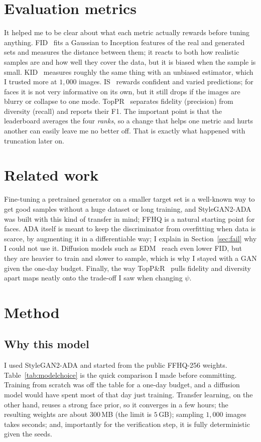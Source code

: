 \documentclass{article}
\begin{document}
\section{Evaluation metrics}
It helped me to be clear about what each metric actually rewards before tuning anything.
FID~\citep{heusel2017fid} fits a Gaussian to Inception features of the real and generated sets and
measures the distance between them; it reacts to both how realistic samples are and how well they cover
the data, but it is biased when the sample is small. KID~\citep{binkowski2018kid} measures roughly the
same thing with an unbiased estimator, which I trusted more at $1{,}000$ images. IS~\citep{salimans2016is}
rewards confident and varied predictions; for faces it is not very informative on its own, but it still
drops if the images are blurry or collapse to one mode. TopPR~\citep{kim2023toppr} separates fidelity
(precision) from diversity (recall) and reports their F1. The important point is that the leaderboard
averages the four \emph{ranks}, so a change that helps one metric and hurts another can easily leave me
no better off. That is exactly what happened with truncation later on.

\section{Related work}
Fine-tuning a pretrained generator on a smaller target set is a well-known way to get good samples
without a huge dataset or long training, and StyleGAN2-ADA~\citep{karras2020ada} was built with this kind
of transfer in mind; FFHQ is a natural starting point for faces. ADA itself is meant to keep the
discriminator from overfitting when data is scarce, by augmenting it in a differentiable way; I explain in
Section~\ref{sec:fail} why I could not use it. Diffusion models such as EDM~\citep{karras2022edm} reach
even lower FID, but they are heavier to train and slower to sample, which is why I stayed with a GAN given
the one-day budget. Finally, the way TopP\&R~\citep{kim2023toppr} pulls fidelity and diversity apart maps
neatly onto the trade-off I saw when changing $\psi$.

\section{Method}

\subsection{Why this model}
I used StyleGAN2-ADA and started from the public FFHQ-256 weights. Table~\ref{tab:modelchoice} is the
quick comparison I made before committing. Training from scratch was off the table for a one-day budget,
and a diffusion model would have spent most of that day just training. Transfer learning, on the other
hand, reuses a strong face prior, so it converges in a few hours; the resulting weights are about
$300$\,MB (the limit is $5$\,GB); sampling $1{,}000$ images takes seconds; and, importantly for the
verification step, it is fully deterministic given the seeds.
\end{document}
